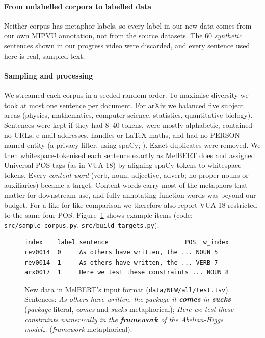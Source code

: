 \documentclass[11pt]{article}
\begin{document}
\paragraph{From unlabelled corpora to labelled data} Neither corpus has metaphor labels, so every label in our new data comes from our own MIPVU annotation, not from the source datasets. The 60 \emph{synthetic} sentences shown in our progress video were discarded, and every sentence used here is real, sampled text.

\paragraph{Sampling and processing} We streamed each corpus in a seeded random order. To maximise diversity we took at most one sentence per document. For arXiv we balanced five subject areas (physics, mathematics, computer science, statistics, quantitative biology). Sentences were kept if they had 8--40 tokens, were mostly alphabetic, contained no URLs, e-mail addresses, handles or LaTeX maths, and had no PERSON named entity (a privacy filter, using spaCy; \citealp{honnibal2020spacy}). Exact duplicates were removed. We then whitespace-tokenised each sentence exactly as MelBERT does and assigned Universal POS tags (as in VUA-18) by aligning spaCy tokens to whitespace tokens. Every \emph{content word} (verb, noun, adjective, adverb; no proper nouns or auxiliaries) became a target. Content words carry most of the metaphors that matter for downstream use, and fully annotating function words was beyond our budget. For a like-for-like comparison we therefore also report VUA-18 restricted to the same four POS. Figure~\ref{fig:newsnippet} shows example items (code: \texttt{src/sample\_corpus.py}, \texttt{src/build\_targets.py}).

\begin{figure}[t]
\centering\scriptsize
\begin{BVerbatim}
index    label sentence                     POS  w_index
rev0014  0     As others have written, the ... NOUN 5
rev0014  1     As others have written, the ... VERB 7
arx0017  1     Here we test these constraints ... NOUN 8
\end{BVerbatim}
\caption{New data in MelBERT's input format (\texttt{data/NEW/all/test.tsv}). Sentences: \textit{As others have written, the package it \textbf{comes} in \textbf{sucks}} (\textit{package} literal, \textit{comes} and \textit{sucks} metaphorical); \textit{Here we test these constraints numerically in the \textbf{framework} of the Abelian-Higgs model\dots} (\textit{framework} metaphorical).}
\label{fig:newsnippet}
\end{figure}
\end{document}
